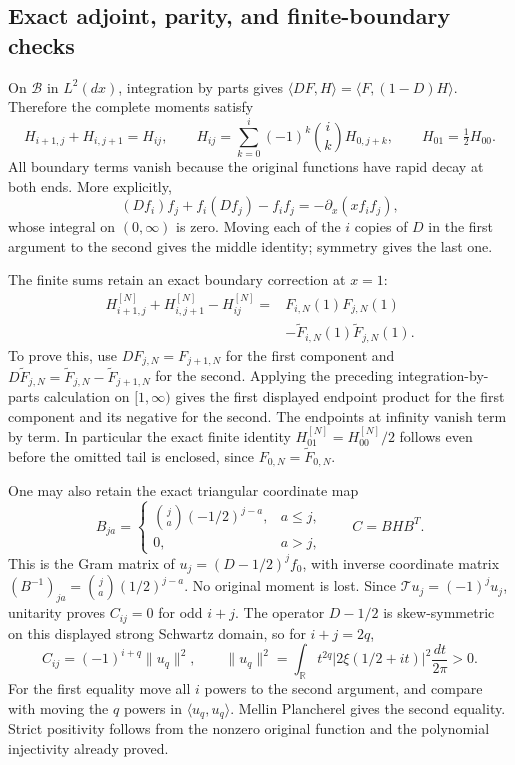 \subsection{Exact adjoint, parity, and finite-boundary checks}

On \(\mathscr B\) in \(L^2(dx)\), integration by parts gives
\(\langle DF,H\rangle=\langle F,(1-D)H\rangle\).
Therefore the complete moments satisfy
\[
 H_{i+1,j}+H_{i,j+1}=H_{ij},\qquad
 H_{ij}=\sum_{k=0}^i(-1)^k\binom ikH_{0,j+k},\qquad
 H_{01}=\tfrac12H_{00}.
 \tag{AM.15}
\]
All boundary terms vanish because the original functions have
rapid decay at both ends.  More explicitly,
\[
 (Df_i)f_j+f_i(Df_j)-f_if_j=-\partial_x(xf_if_j),
\]
whose integral on \((0,\infty)\) is zero.  Moving each of the
\(i\) copies of \(D\) in the first argument to the second gives
the middle identity; symmetry gives the last one.

The finite sums retain an exact boundary correction at \(x=1\):
\[
 \begin{aligned}
 H_{i+1,j}^{[N]}+H_{i,j+1}^{[N]}-H_{ij}^{[N]}
 ={}&F_{i,N}(1)F_{j,N}(1)\\[-2pt]
 &-\widetilde F_{i,N}(1)\widetilde F_{j,N}(1).
 \end{aligned}
 \tag{AM.16}
\]
To prove this, use \(DF_{j,N}=F_{j+1,N}\) for the first
component and \(D\widetilde F_{j,N}=\widetilde F_{j,N}
-\widetilde F_{j+1,N}\) for the second.  Applying the preceding
integration-by-parts calculation on \([1,\infty)\) gives the
first displayed endpoint product for the first component and
its negative for the second.  The endpoints at infinity vanish
term by term.  In particular the exact finite identity
\(H_{01}^{[N]}=H_{00}^{[N]}/2\) follows even before the omitted
tail is enclosed, since \(F_{0,N}=\widetilde F_{0,N}\).

One may also retain the exact triangular coordinate map
\[
 B_{ja}=\begin{cases}\binom ja(-1/2)^{j-a},&a\leq j,\\0,&a>j,
             \end{cases}
 \qquad C=BHB^T.
 \tag{AM.17}
\]
This is the Gram matrix of \(u_j=(D-1/2)^jf_0\), with inverse
coordinate matrix \((B^{-1})_{ja}=\binom ja(1/2)^{j-a}\).
No original moment is lost.  Since
\(\mathcal Tu_j=(-1)^ju_j\), unitarity proves \(C_{ij}=0\)
for odd \(i+j\).  The operator \(D-1/2\) is skew-symmetric on
this displayed strong Schwartz domain, so for \(i+j=2q\),
\[
 C_{ij}=(-1)^{i+q}\|u_q\|^2,\qquad
 \|u_q\|^2=\int_{\mathbb R}t^{2q}|2\xi(1/2+it)|^2
                                      \frac{dt}{2\pi}>0.
 \tag{AM.18}
\]
For the first equality move all \(i\) powers to the second
argument, and compare with moving the \(q\) powers in
\(\langle u_q,u_q\rangle\).  Mellin Plancherel gives the
second equality.  Strict positivity follows from the nonzero
original function and the polynomial injectivity already proved.


